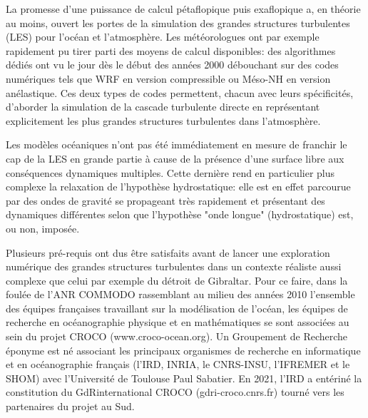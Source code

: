La promesse d’une puissance de calcul pétaflopique puis exaflopique a, en théorie au moins, ouvert les portes de la simulation des grandes structures turbulentes (LES) pour l’océan et l’atmosphère. Les météorologues ont par exemple rapidement pu tirer parti des moyens de calcul disponibles: des algorithmes dédiés ont vu le jour dès le début des années 2000 débouchant sur des codes numériques tels que WRF \citep{skamarock_prototypes_2001} en version compressible ou Méso-NH \citep{lac_overview_2018} en version anélastique. Ces deux types de codes permettent, chacun avec leurs spécificités, d’aborder la simulation de la cascade turbulente directe en représentant explicitement les plus grandes structures turbulentes dans l’atmosphère.

Les modèles océaniques n’ont pas été immédiatement en mesure de franchir le cap de la LES en grande partie à cause de la présence d’une surface libre aux conséquences dynamiques multiples. Cette dernière rend en particulier plus complexe la relaxation de l’hypothèse hydrostatique: elle est en effet parcourue par des ondes de gravité se propageant très rapidement et présentant des dynamiques différentes selon que l'hypothèse "onde longue" (hydrostatique) est, ou non, imposée. %


Plusieurs pré-requis ont dus être satisfaits avant de lancer une exploration numérique des grandes structures turbulentes dans un contexte réaliste aussi complexe que celui par exemple du détroit de Gibraltar.
Pour ce faire, dans la foulée de l’ANR COMMODO rassemblant au milieu des années 2010 l’ensemble des équipes françaises travaillant sur la modélisation de l’océan, les équipes de recherche en océanographie physique et en mathématiques se sont associées au sein du projet CROCO (www.croco-ocean.org). Un Groupement de Recherche éponyme est né associant les principaux organismes de recherche en informatique et en océanographie français (l’IRD, INRIA, le CNRS-INSU, l’IFREMER et le SHOM) avec l'Université de Toulouse Paul Sabatier. En 2021, l’IRD a entériné la constitution du GdRinternational CROCO (gdri-croco.cnrs.fr) tourné vers les partenaires du projet au Sud. %

